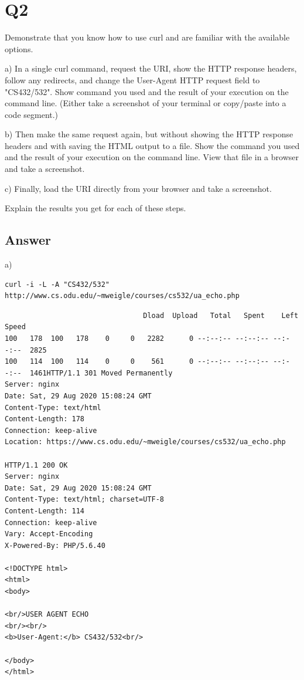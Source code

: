 \documentclass[12pt]{article}
\begin{document}
\section*{Q2}
Demonstrate that you know how to use curl and are familiar with the available options.



a) In a single curl command, request the URI, show the HTTP response headers, follow any redirects, and change the User-Agent HTTP request field to "CS432/532". Show command you used and the result of your execution on the command line. (Either take a screenshot of your terminal or copy/paste into a code segment.)

b) Then make the same request again, but without showing the HTTP response headers and with saving the HTML output to a file. Show the command you used and the result of your execution on the command line. View that file in a browser and take a screenshot.

c) Finally, load the URI directly from your browser and take a screenshot.

Explain the results you get for each of these steps.
\subsection*{Answer}
a)
\begin{lstlisting}[numbers=none, caption=Command, label=lst:q2ACommand]
curl -i -L -A "CS432/532" http://www.cs.odu.edu/~mweigle/courses/cs532/ua_echo.php
\end{lstlisting}
\begin{lstlisting}[numbers=none, caption=Response, label=lst:q2AResponse]
  % Total    % Received % Xferd  Average Speed   Time    Time     Time  Current
                                 Dload  Upload   Total   Spent    Left  Speed
100   178  100   178    0     0   2282      0 --:--:-- --:--:-- --:--:--  2825
100   114  100   114    0     0    561      0 --:--:-- --:--:-- --:--:--  1461HTTP/1.1 301 Moved Permanently
Server: nginx
Date: Sat, 29 Aug 2020 15:08:24 GMT
Content-Type: text/html
Content-Length: 178
Connection: keep-alive
Location: https://www.cs.odu.edu/~mweigle/courses/cs532/ua_echo.php

HTTP/1.1 200 OK
Server: nginx
Date: Sat, 29 Aug 2020 15:08:24 GMT
Content-Type: text/html; charset=UTF-8
Content-Length: 114
Connection: keep-alive
Vary: Accept-Encoding
X-Powered-By: PHP/5.6.40

<!DOCTYPE html>
<html>
<body>

<br/>USER AGENT ECHO
<br/><br/>
<b>User-Agent:</b> CS432/532<br/>

</body>
</html>
\end{lstlisting}
\end{document}
